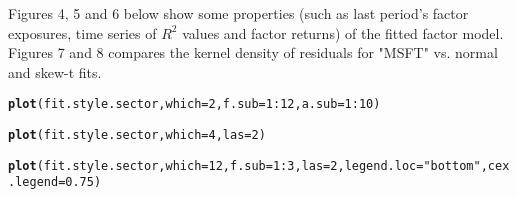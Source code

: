 \documentclass[a4paper]{article}\usepackage[]{graphicx}\usepackage[]{color}
\makeatletter
\newcommand{\hlnum}[1]{\textcolor[rgb]{0.686,0.059,0.569}{#1}}%
\newcommand{\hlstr}[1]{\textcolor[rgb]{0.192,0.494,0.8}{#1}}%
\newcommand{\hlopt}[1]{\textcolor[rgb]{0,0,0}{#1}}%
\newcommand{\hlstd}[1]{\textcolor[rgb]{0.345,0.345,0.345}{#1}}%
\newcommand{\hlkwc}[1]{\textcolor[rgb]{0.333,0.667,0.333}{#1}}%
\newcommand{\hlkwd}[1]{\textcolor[rgb]{0.737,0.353,0.396}{\textbf{#1}}}%
\newenvironment{kframe}{%
 \def\at@end@of@kframe{}%
 \ifinner\ifhmode%
  \def\at@end@of@kframe{\end{minipage}}%
  \begin{minipage}{\columnwidth}%
 \fi\fi%
 \def\FrameCommand##1{\hskip\@totalleftmargin \hskip-\fboxsep
 \colorbox{shadecolor}{##1}\hskip-\fboxsep
     \hskip-\linewidth \hskip-\@totalleftmargin \hskip\columnwidth}%
 \MakeFramed {\advance\hsize-\width
   \@totalleftmargin\z@ \linewidth\hsize
   \@setminipage}}%
 {\par\unskip\endMakeFramed%
 \at@end@of@kframe}
\newenvironment{knitrout}{}{} %
\makeatother
\begin{document}
Figures 4, 5 and 6 below show some properties (such as last period's factor exposures, time series of $R^2$ values and factor returns) of the fitted factor model. Figures 7 and 8 compares the kernel density of residuals for "MSFT" vs. normal and skew-t fits.

\begin{knitrout}
\color{fgcolor}\begin{kframe}
\begin{alltt}
\hlkwd{plot}\hlstd{(fit.style.sector,} \hlkwc{which}\hlstd{=}\hlnum{2}\hlstd{,} \hlkwc{f.sub}\hlstd{=}\hlnum{1}\hlopt{:}\hlnum{12}\hlstd{,} \hlkwc{a.sub}\hlstd{=}\hlnum{1}\hlopt{:}\hlnum{10}\hlstd{)}
\end{alltt}


{\ttfamily\noindent\bfseries\color{errorcolor}{\#\# Error in xy.coords(x, y, xlabel, ylabel, log): 'x' is a list, but does not have components 'x' and 'y'}}\end{kframe}
\end{knitrout}

\begin{knitrout}
\color{fgcolor}\begin{kframe}
\begin{alltt}
\hlkwd{plot}\hlstd{(fit.style.sector,} \hlkwc{which}\hlstd{=}\hlnum{4}\hlstd{,} \hlkwc{las}\hlstd{=}\hlnum{2}\hlstd{)}
\end{alltt}


{\ttfamily\noindent\bfseries\color{errorcolor}{\#\# Error in xy.coords(x, y, xlabel, ylabel, log): 'x' is a list, but does not have components 'x' and 'y'}}\end{kframe}
\end{knitrout}

\begin{knitrout}
\color{fgcolor}\begin{kframe}
\begin{alltt}
\hlkwd{plot}\hlstd{(fit.style.sector,} \hlkwc{which}\hlstd{=}\hlnum{12}\hlstd{,} \hlkwc{f.sub}\hlstd{=}\hlnum{1}\hlopt{:}\hlnum{3}\hlstd{,} \hlkwc{las}\hlstd{=}\hlnum{2}\hlstd{,} \hlkwc{legend.loc}\hlstd{=}\hlstr{"bottom"}\hlstd{,} \hlkwc{cex.legend}\hlstd{=}\hlnum{0.75}\hlstd{)}
\end{alltt}


{\ttfamily\noindent\bfseries\color{errorcolor}{\#\# Error in xy.coords(x, y, xlabel, ylabel, log): 'x' is a list, but does not have components 'x' and 'y'}}\end{kframe}
\end{knitrout}
\end{document}

